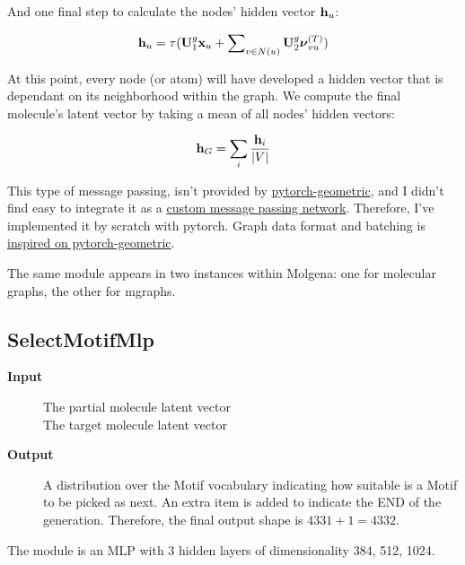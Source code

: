 \documentclass{article}
\begin{document}
And one final step to calculate the nodes' hidden vector $\mathbf{h}_u$:

\begin{equation}
    \mathbf{h}_u = \tau(\mathbf{U}_1^g \mathbf{x}_u + \sum\nolimits_{v \in N(u)} \mathbf{U}_2^g \boldsymbol\nu_{vu}^{(T)})
\end{equation}

At this point, every node (or atom) will have developed a hidden vector that is dependant on its neighborhood within the graph.
We compute the final molecule's latent vector by taking a mean of all nodes' hidden vectors:

\begin{equation}
    \mathbf{h}_G = \sum_i \frac{\mathbf{h}_i}{\vert V \vert}
\end{equation}

This type of message passing, isn't provided by \href{https://pytorch-geometric.readthedocs.io/en/latest/}{pytorch-geometric},
and I didn't find easy to integrate it as a \href{https://pytorch-geometric.readthedocs.io/en/latest/notes/create_gnn.html}{custom message passing network}.
Therefore, I've implemented it by scratch with pytorch. Graph data format and batching is \href{https://pytorch-geometric.readthedocs.io/en/latest/advanced/batching.html}{inspired on pytorch-geometric}.

The same module appears in two instances within Molgena: one for molecular graphs, the other for mgraphs.


\subsection{SelectMotifMlp}

\begin{description}
\item[\textbf{Input}]
    The partial molecule latent vector\\
    The target molecule latent vector
\item[\textbf{Output}]
    A distribution over the Motif vocabulary indicating how suitable is a Motif to be picked as next.
    An extra item is added to indicate the END of the generation.
    Therefore, the final output shape is $4331 + 1 = 4332$.
\end{description}

The module is an MLP with 3 hidden layers of dimensionality 384, 512, 1024.

\end{document}
